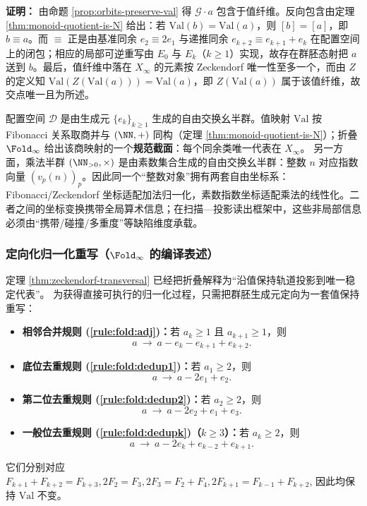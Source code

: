 \textbf{证明：}
由命题 \ref{prop:orbits-preserve-val} 得 $\mathcal{G}\cdot a$ 包含于值纤维。反向包含由定理 \ref{thm:monoid-quotient-is-N} 给出：若 $\mathrm{Val}(b)=\mathrm{Val}(a)$，则 $[b]=[a]$，即 $b\equiv a$。而 $\equiv$ 正是由基准同余 $e_2\equiv 2e_1$ 与递推同余 $e_{k+2}\equiv e_{k+1}+e_k$ 在配置空间上的闭包；相应的局部可逆重写由 $E_0$ 与 $E_k$（$k\ge 1$）实现，故存在群胚态射把 $a$ 送到 $b$。最后，值纤维中落在 $X_\infty$ 的元素按 Zeckendorf 唯一性至多一个，而由 $Z$ 的定义知 $\mathrm{Val}(Z(\mathrm{Val}(a)))=\mathrm{Val}(a)$，即 $Z(\mathrm{Val}(a))$ 属于该值纤维，故交点唯一且为所述。

\begin{remark}[两套自由交换幺半群坐标与规范截面]\label{rem:two-coordinate-monoids}
配置空间 $\mathcal{D}$ 是由生成元 $\{e_k\}_{k\ge 1}$ 生成的自由交换幺半群。值映射 $\mathrm{Val}$ 按 Fibonacci 关系取商并与 $(\NN,+)$ 同构（定理 \ref{thm:monoid-quotient-is-N}）；折叠 $\Fold_\infty$ 给出该商映射的一个\textbf{规范截面}：每个同余类唯一代表在 $X_\infty$。
另一方面，乘法半群 $(\NN_{>0},\times)$ 是由素数集合生成的自由交换幺半群：整数 $n$ 对应指数向量 $(v_p(n))_p$。因此同一个“整数对象”拥有两套自由坐标系：Fibonacci/Zeckendorf 坐标适配加法归一化，素数指数坐标适配乘法的线性化。二者之间的坐标变换携带全局算术信息；在扫描—投影读出框架中，这些非局部信息必须由“携带/碰撞/多重度”等缺陷维度承载。
\end{remark}

\subsubsection{定向化归一化重写（\texorpdfstring{$\Fold_\infty$}{Fold\_infty} 的编译表述）}\label{subsec:directed-rewrite}
定理 \ref{thm:zeckendorf-transversal} 已经把折叠解释为“沿值保持轨道投影到唯一稳定代表”。
为获得直接可执行的归一化过程，只需把群胚生成元定向为一套值保持重写：
\begin{itemize}
  \item \textbf{相邻合并规则 (\ref{rule:fold:adj})：}若 $a_k\ge 1$ 且 $a_{k+1}\ge 1$，则
  \[
  a\ \to\ a-e_k-e_{k+1}+e_{k+2}.
  \]
  \item \textbf{底位去重规则 (\ref{rule:fold:dedup1})：}若 $a_1\ge 2$，则
  \[
  a\ \to\ a-2e_1+e_2.
  \]
  \item \textbf{第二位去重规则 (\ref{rule:fold:dedup2})：}若 $a_2\ge 2$，则
  \[
  a\ \to\ a-2e_2+e_1+e_3.
  \]
  \item \textbf{一般位去重规则 (\ref{rule:fold:dedupk})（$k\ge 3$）：}若 $a_k\ge 2$，则
  \[
  a\ \to\ a-2e_k+e_{k-2}+e_{k+1}.
  \]
\end{itemize}
它们分别对应
\(
F_{k+1}+F_{k+2}=F_{k+3},
2F_2=F_3,
2F_3=F_2+F_4,
2F_{k+1}=F_{k-1}+F_{k+2}
\),
因此均保持 $\mathrm{Val}$ 不变。

